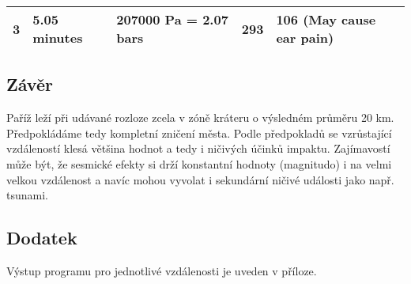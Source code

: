 \documentclass[
]{article}
\begin{document}
\begin{longtable}[]{@{}lllll@{}}
\begin{minipage}[t]{0.03\columnwidth}\raggedright
3\strut
\end{minipage} & \begin{minipage}[t]{0.12\columnwidth}\raggedright
5.05 minutes\strut
\end{minipage} & \begin{minipage}[t]{0.29\columnwidth}\raggedright
207000 Pa = 2.07 bars\strut
\end{minipage} & \begin{minipage}[t]{0.22\columnwidth}\raggedright
293\strut
\end{minipage} & \begin{minipage}[t]{0.21\columnwidth}\raggedright
106 (May cause ear pain)\strut
\end{minipage}\tabularnewline
\bottomrule
\end{longtable}

\hypertarget{zuxe1vux11br}{%
\subsection{Závěr}\label{zuxe1vux11br}}

Paříž leží při udávané rozloze zcela v zóně kráteru o výsledném průměru
20 km. Předpokládáme tedy kompletní zničení města. Podle předpokladů se
vzrůstající vzdáleností klesá většina hodnot a tedy i ničivých účinků
impaktu. Zajímavostí může být, že sesmické efekty si drží konstantní
hodnoty (magnitudo) i na velmi velkou vzdálenost a navíc mohou vyvolat i
sekundární ničivé události jako např. tsunami.

\hypertarget{dodatek}{%
\subsection{Dodatek}\label{dodatek}}

Výstup programu pro jednotlivé vzdálenosti je uveden v příloze.
\end{document}
